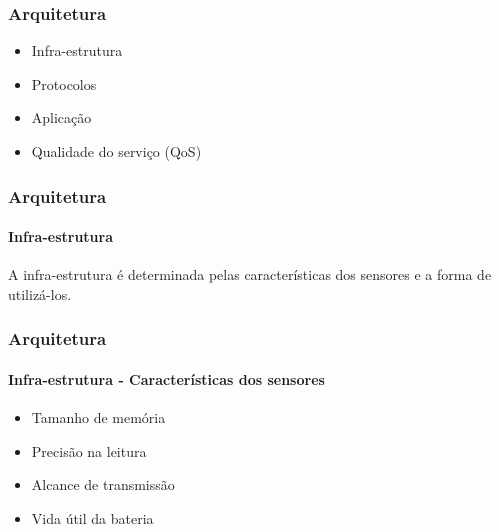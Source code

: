 \documentclass[notes]{beamer}
\begin{document}
\begin{frame}
\frametitle{Arquitetura}

\begin{block}

\begin{itemize}

\item Infra-estrutura \pause

\item Protocolos \pause

\item Aplicação \pause

\item Qualidade do serviço (QoS)

\end{itemize}

\end{block}

\end{frame}

\begin{frame}
\frametitle{Arquitetura}
\framesubtitle{Infra-estrutura}

\begin{block}

A infra-estrutura é determinada pelas características dos sensores e a forma de utilizá-los.

\end{block}

\end{frame}

\begin{frame}
\frametitle{Arquitetura}
\framesubtitle{Infra-estrutura - Características dos sensores}

\begin{block}

\begin{itemize}

\item Tamanho de memória \pause
\item Precisão na leitura \pause
\item Alcance de transmissão \pause
\item Vida útil da bateria 

\end{itemize}

\end{block}

\end{frame}
\end{document}
